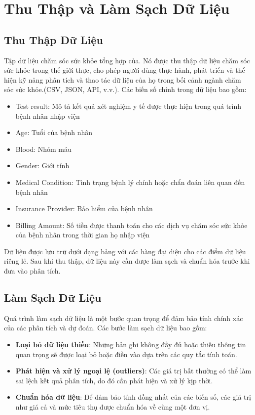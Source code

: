 \documentclass[a4paper,12pt]{report}
\begin{document}
\section{Thu Thập và Làm Sạch Dữ Liệu}

\subsection{Thu Thập Dữ Liệu}
Tập dữ liệu chăm sóc sức khỏe tổng hợp của. Nó được thu thập dữ liệu chăm sóc sức khỏe trong thế giới thực, cho phép người dùng thực hành, phát triển và thể hiện kỹ năng phân tích và thao tác dữ liệu của họ trong bối cảnh ngành chăm sóc sức khỏe.(CSV, JSON, API, v.v.). Các biến số chính trong dữ liệu bao gồm:
\begin{itemize}
    \item Test result: Mô tả kết quả xét nghiệm y tế được thực hiện trong quá trình bệnh nhân nhập viện
    \item Age: Tuổi của bệnh nhân
    \item Blood: Nhóm máu
    \item Gender: Giới tính
    \item Medical Condition: Tình trạng bệnh lý chính hoặc chẩn đoán liên quan đến bệnh nhân
    \item Insurance Provider: Bảo hiểm của bệnh nhân
    \item Billing Amount: Số tiền được thanh toán cho các dịch vụ chăm sóc sức khỏe của bệnh nhân trong thời gian họ nhập viện
\end{itemize}

Dữ liệu được lưu trữ dưới dạng bảng với các hàng đại diện cho các điểm dữ liệu riêng lẻ. Sau khi thu thập, dữ liệu này cần được làm sạch và chuẩn hóa trước khi đưa vào phân tích.

\subsection{Làm Sạch Dữ Liệu}
Quá trình làm sạch dữ liệu là một bước quan trọng để đảm bảo tính chính xác của các phân tích và dự đoán. Các bước làm sạch dữ liệu bao gồm:
\begin{itemize}
    \item \textbf{Loại bỏ dữ liệu thiếu}: Những bản ghi không đầy đủ hoặc thiếu thông tin quan trọng sẽ được loại bỏ hoặc điền vào dựa trên các quy tắc tính toán.
    \item \textbf{Phát hiện và xử lý ngoại lệ (outliers)}: Các giá trị bất thường có thể làm sai lệch kết quả phân tích, do đó cần phát hiện và xử lý kịp thời.
    \item \textbf{Chuẩn hóa dữ liệu}: Để đảm bảo tính đồng nhất của các biến số, các giá trị như giá cả và mức tiêu thụ được chuẩn hóa về cùng một đơn vị.
\end{itemize}
\end{document}
